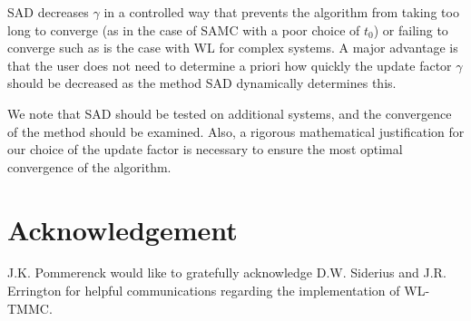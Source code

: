 \documentclass[letterpaper,twocolumn,amsmath,amssymb,pre,aps,10pt]{revtex4-1}
\newcommand{\blue}[1]{{\bf \color{blue} #1}}
\newcommand{\jpsays}[1]{{\color{red} [\blue{Jordan:} \emph{#1}]}}
\begin{document}
SAD decreases $\gamma$ in a controlled way that prevents the algorithm
from taking too long to converge (as in the case of SAMC with a poor choice
of $t_0$) or failing to converge such as is the case with WL for complex
systems. A major advantage is that the user does not need to determine a
priori how quickly the update factor $\gamma$ should be decreased as the
method SAD dynamically determines this.

We note that SAD should be tested on additional systems, and the
convergence of the method should be examined.  Also, a rigorous
mathematical justification for our choice of the update factor is
necessary to ensure the most optimal convergence of the algorithm.

\section{Acknowledgement}

J.K. Pommerenck would like to gratefully acknowledge D.W. Siderius and
J.R. Errington for helpful communications regarding the implementation
of WL-TMMC.



\end{document}
